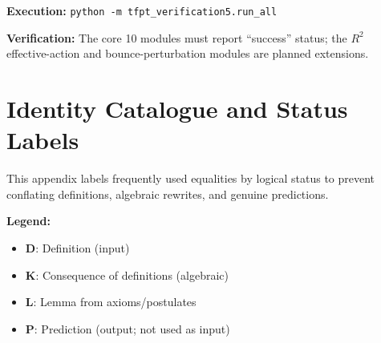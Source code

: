 \textbf{Execution:} \texttt{python -m tfpt\_verification5.run\_all}

\textbf{Verification:} The core 10 modules must report ``success'' status; the
$R^2$ effective-action and bounce-perturbation modules are planned extensions.

\section{Identity Catalogue and Status Labels}
\label{app:identities}

This appendix labels frequently used equalities by logical status to prevent conflating definitions, algebraic rewrites, and genuine predictions.

\textbf{Legend:}
\begin{itemize}[leftmargin=1.5em, topsep=2pt, itemsep=1pt]
    \item \textbf{D}: Definition (input)
    \item \textbf{K}: Consequence of definitions (algebraic)
    \item \textbf{L}: Lemma from axioms/postulates
    \item \textbf{P}: Prediction (output; not used as input)
\end{itemize}

